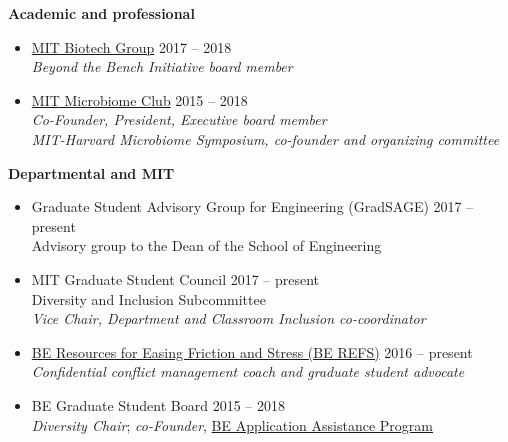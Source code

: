 \documentclass[10pt]{article}
\newenvironment{outerlist}[1][\enskip\textbullet]%
        {\begin{itemize}[#1,leftmargin=*]}{\end{itemize}%
         \vspace{-.6\baselineskip}}
\begin{document}
\textbf{Academic and professional}
\begin{outerlist}
	\item[] \href{http://biotech.mit.edu/}{MIT Biotech Group} \hfill {2017 -- 2018} \\ 
		\textit{Beyond the Bench Initiative board member} 
	\item[] \href{https://twitter.com/MITubiomeclub}{MIT Microbiome Club} \hfill {2015 -- 2018} \\ 
		\textit{Co-Founder, President, Executive board member} \\
		\textit{MIT-Harvard Microbiome Symposium, co-founder and organizing committee}
\end{outerlist}
\vspace{.15in}

\textbf{Departmental and MIT}
\begin{outerlist}
	\item[] Graduate Student Advisory Group for Engineering (GradSAGE) \hfill {2017 -- present} \\
	Advisory group to the Dean of the School of Engineering
	\item[] MIT Graduate Student Council \hfill {2017 -- present} \\
		Diversity and Inclusion Subcommittee  \\
		\textit{Vice Chair, Department and Classroom Inclusion co-coordinator} 
	\item[] \href{http://berefs.com/}{BE Resources for Easing Friction and Stress (BE REFS)} \hfill {2016 -- present} \\
	\textit{Confidential conflict management coach and graduate student advocate}
	\item[] BE Graduate Student Board \hfill {2015 -- 2018} \\ 
		\textit{Diversity Chair}; \textit{co-Founder}, \href{http://be.mit.edu/academic-programs/prospective-graduate/beaap}{BE Application Assistance Program} 
\end{outerlist}
\vspace{.15in}
\end{document}
